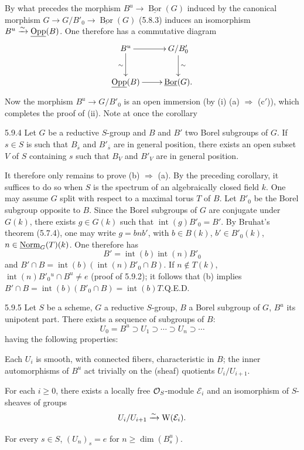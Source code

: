 By what precedes the morphism $B^u\to\underline{\operatorname{Bor}}(G)$ induced by the canonical morphism $G\to G/B'_0\to\underline{\operatorname{Bor}}(G)$ (5.8.3) induces an isomorphism $B^u\xrightarrow{\sim}\underline{\operatorname{Opp}}(B)$. One therefore has a commutative diagram
\[
\xymatrix{B^u\ar[r]\ar[d]_\sim&G/B'_0\ar[d]^\sim\\
\underline{\operatorname{Opp}}(B)\ar[r]&\underline{\operatorname{Bor}}(G).}
\]
Now the morphism $B^u\to G/B'_0$ is an open immersion (by (i) (a) $\Rightarrow$ (c$'$)), which completes the proof of (ii). Note at once the corollary
\begin{corollary}{5.9.4}\label{XXII.5.9.4}
Let $G$ be a reductive $S$-group and $B$ and $B'$ two Borel subgroups of $G$. If $s\in S$ is such that $B_{\overline s}$ and $B'_{\overline s}$ are in general position, there exists an open subset $V$ of $S$ containing $s$ such that $B_V$ and $B'_V$ are in general position.
\end{corollary}
It therefore only remains to prove (b) $\Rightarrow$ (a). By the preceding corollary, it suffices to do so when $S$ is the spectrum of an algebraically closed field $k$. One may assume $G$ split with respect to a maximal torus $T$ of $B$. Let $B'_0$ be the Borel subgroup opposite to $B$. Since the Borel subgroups of $G$ are conjugate under $G(k)$, there exists $g\in G(k)$ such that $\operatorname{int}(g)B'_0=B'$. By Bruhat's theorem (5.7.4), one may write $g=bnb'$, with $b\in B(k)$, $b'\in B'_0(k)$, $n\in\underline{\mathrm{Norm}}_G(T)(k)$. One therefore has
\[
B'=\operatorname{int}(b)\operatorname{int}(n)B'_0
\]
and $B'\cap B=\operatorname{int}(b)(\operatorname{int}(n)B'_0\cap B)$. If $n\notin T(k)$, $\operatorname{int}(n)B'_0{}^u\cap B^u\ne e$ (\cf proof of 5.9.2); it follows that (b) implies $B'\cap B=\operatorname{int}(b)(B'_0\cap B)=\operatorname{int}(b)T$.\hfill Q.E.D.
\begin{proposition}{5.9.5}\label{XXII.5.9.5}
Let $S$ be a scheme, $G$ a reductive $S$-group, $B$ a Borel subgroup of $G$, $B^u$ its unipotent part. There exists a sequence of subgroups of $B$:
\[
U_0=B^u\supset U_1\supset\cdots\supset U_n\supset\cdots
\]
having the following properties:
\begin{enumeratei}
\item Each $U_i$ is smooth, with connected fibers, characteristic in $B$; the inner automorphisms of $B^u$ act trivially on the (sheaf) quotients $U_i/U_{i+1}$.
\item For each $i\ge0$, there exists a locally free $\mathcal{O}_S$-module $\mathcal E_i$ and an isomorphism of $S$-sheaves of groups
\[
U_i/U_{i+1}\xrightarrow{\sim}\mathrm W(\mathcal E_i).
\]
\item For every $s\in S$, $(U_n)_s=e$ for $n\ge\dim(B_s^u)$.
\end{enumeratei}
\end{proposition}
